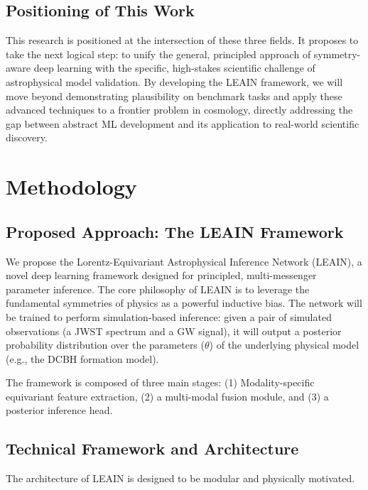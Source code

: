 \documentclass[11pt, a4paper]{article}
\begin{document}
\subsection{Positioning of This Work}
This research is positioned at the intersection of these three fields. It proposes to take the next logical step: to unify the general, principled approach of symmetry-aware deep learning with the specific, high-stakes scientific challenge of astrophysical model validation. By developing the LEAIN framework, we will move beyond demonstrating plausibility on benchmark tasks and apply these advanced techniques to a frontier problem in cosmology, directly addressing the gap between abstract ML development and its application to real-world scientific discovery.

\section{Methodology}

\subsection{Proposed Approach: The LEAIN Framework}
We propose the Lorentz-Equivariant Astrophysical Inference Network (LEAIN), a novel deep learning framework designed for principled, multi-messenger parameter inference. The core philosophy of LEAIN is to leverage the fundamental symmetries of physics as a powerful inductive bias. The network will be trained to perform simulation-based inference: given a pair of simulated observations (a JWST spectrum and a GW signal), it will output a posterior probability distribution over the parameters ($\theta$) of the underlying physical model (e.g., the DCBH formation model).

The framework is composed of three main stages: (1) Modality-specific equivariant feature extraction, (2) a multi-modal fusion module, and (3) a posterior inference head.

\subsection{Technical Framework and Architecture}
The architecture of LEAIN is designed to be modular and physically motivated.
\end{document}
